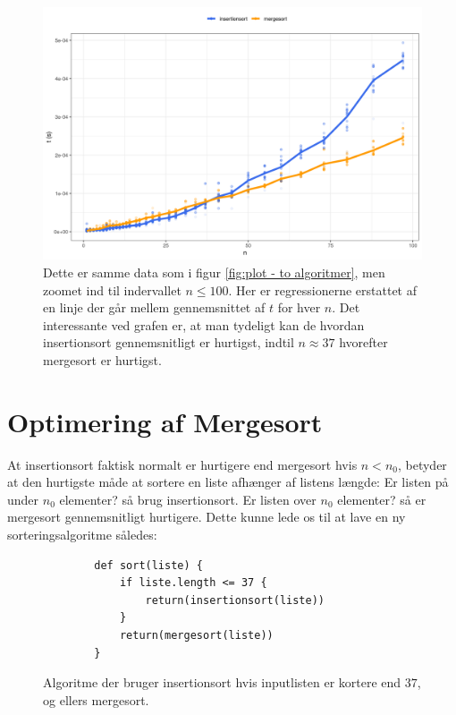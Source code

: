 \begin{figure}
	\begin{center}
		\includegraphics[scale=0.6]{../img/toAlgoritmerZoomedGns.png}
	\end{center}
	\caption{Dette er samme data som i figur \ref{fig:plot - to algoritmer}, men zoomet ind til indervallet $n \leq 100$. Her er regressionerne erstattet af en linje der går mellem gennemsnittet af $t$ for hver $n$. Det interessante ved grafen er, at man tydeligt kan de hvordan insertionsort gennemsnitligt er hurtigst, indtil $n \approx 37$ hvorefter mergesort er hurtigst.}
	\label{fig:toAlgoritmerZoomedGns}
\end{figure}

\section{Optimering af Mergesort}%
\label{sub:Optimering af Mergesort}

At insertionsort faktisk normalt er hurtigere end mergesort hvis $n < n_0$, betyder at den hurtigste måde at sortere en liste afhænger af listens længde: Er listen på under $n_0$ elementer? så brug insertionsort. Er listen over $n_0$ elementer? så er mergesort gennemsnitligt hurtigere. Dette kunne lede os til at lave en ny sorteringsalgoritme således:

\begin{figure}[h]
	\begin{center}
		\begin{lstlisting}
		def sort(liste) {
			if liste.length <= 37 {
				return(insertionsort(liste))
			}
			return(mergesort(liste))
		}
		\end{lstlisting}
	\end{center}
	\vspace{-6mm}
	\caption{Algoritme der bruger insertionsort hvis inputlisten er kortere end $37$, og ellers mergesort.}
	\label{fig:hybridalgoritme1}
\end{figure}


